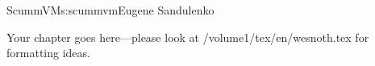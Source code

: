 \begin{aosachapter}{ScummVM}{s:scummvm}{Eugene Sandulenko}

Your chapter goes here---please look at /volume1/tex/en/wesnoth.tex for 
formatting ideas.

\end{aosachapter}
